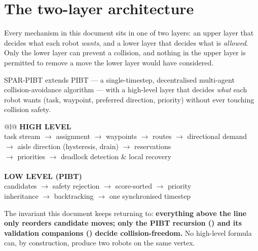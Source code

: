\section{The two-layer architecture}
\label{sec:architecture}

\begin{lede}
Every mechanism in this document sits in one of two layers: an upper layer that
decides what each robot \emph{wants}, and a lower layer that decides what is
\emph{allowed}. Only the lower layer can prevent a collision, and nothing in
the upper layer is permitted to remove a move the lower layer would have
considered.
\end{lede}

SPAR-PIBT extends PIBT \citep{okumura2019pibt} --- a single-timestep,
decentralised multi-agent collision-avoidance algorithm --- with a high-level
layer that decides \emph{what} each robot wants (task, waypoint, preferred
direction, priority) without ever touching collision safety.

\begin{center}
\small\ttfamily
\begin{tabular}{@{}l@{}}
\toprule
\textbf{\textsf{HIGH LEVEL}} \\
task stream $\rightarrow$ assignment $\rightarrow$ waypoints $\rightarrow$ routes $\rightarrow$ directional demand \\
$\rightarrow$ aisle direction (hysteresis, drain) $\rightarrow$ reservations \\
$\rightarrow$ priorities $\rightarrow$ deadlock detection \& local recovery \\
\midrule
{} \\
\midrule
\textbf{\textsf{LOW LEVEL (PIBT)}} \\
candidates $\rightarrow$ safety rejection $\rightarrow$ score-sorted $\rightarrow$ priority \\
inheritance $\rightarrow$ backtracking $\rightarrow$ one synchronised timestep \\
\bottomrule
\end{tabular}
\end{center}

The invariant this document keeps returning to: \textbf{everything above the
line only reorders candidate moves; only the PIBT recursion
() and its validation companions ()
decide collision-freedom.} No high-level formula can, by construction, produce
two robots on the same vertex.

